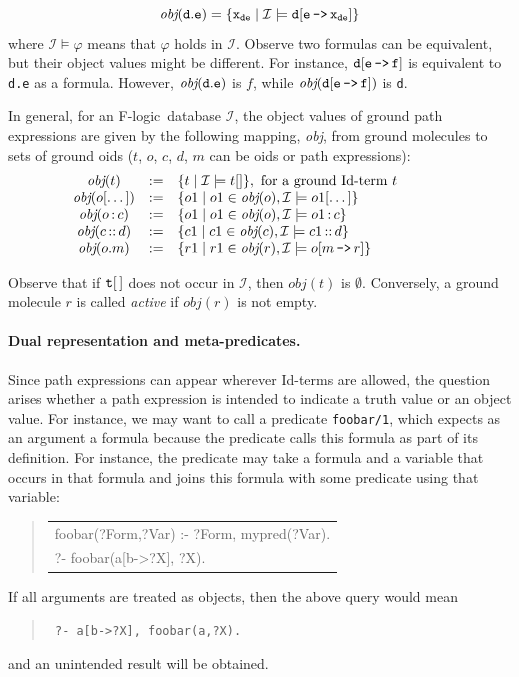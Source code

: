 \documentclass[11pt]{article}
\newenvironment{qrules}{\begin{quote}\tt\begin{tabular}[t]{l}}%
{\end{tabular}\end{quote}}
\newcommand{\obj}{\textit{obj}\xspace}
\newcommand{\db}[1]{\ensuremath{\mathcal{#1}}}
\newcommand{\isa}{\,{\bf{:}}\,}
\newcommand{\subcl}{\,{\bf{::}}\,}
\newcommand{\mvd}{{\mbox{\tt \,->\,}}}  %
\newcommand{\fl}{\mbox{F-logic}\xspace}
\begin{document}
\begin{displaymath} \tt
\obj(d.e) = \{x_{de} \mid \db I \models d[e\mvd 
x_{de}]\} 
\end{displaymath}
%
where $\db I \models \varphi$ means that $\varphi$ holds in \db I.  Observe
two formulas can be equivalent, but their object values might be different.
For instance, $\tt d[e\mvd f]$ is equivalent to {\tt d.e} as a formula.
However, $\tt \obj(d.e)$ is $f$, while $\tt \obj(d[e\mvd f])$ is {\tt d}.

In general, for an \fl\ database \db I, the object values of ground path
expressions are given by the following mapping, \obj, from ground molecules
to sets of ground oids ($t$, $o$, $c$, $d$, $m$ can be oids or path
expressions):
%
\begin{displaymath}
  \begin{array}{cll@{\hspace{4em}}c}
    \obj(t) & := & \{t \mid  \db I\models t[] \}, 
     \textrm{ for a ground Id-term $t$}  \\   
    \obj(o[\dots]) & := & \{o1 \mid o1\in\obj(o), \db I \models o1[\dots]
    \} \\  
    \obj(o\isa c) & := & \{o1 \mid o1\in\obj(o), \db I \models o1\isa c\}
     \\ 
    \obj(c\subcl d) & := & \{c1 \mid c1\in\obj(c), \db I \models c1\subcl
    d\} \\ 
    \obj(o.m) & :=  & \{r1 \mid r1\in\obj(r), \db I \models o[m\mvd
    r]\}  
  \end{array}
\end{displaymath}

Observe that if $\tt t[\,]$ does not occur in \db{I}, then $\obj(t)$ is
$\emptyset$.  Conversely, a ground molecule $r$ is called \emph{active} if
$\obj(r)$ is not empty.

\paragraph{Dual representation and meta-predicates.}
Since path expressions can appear wherever Id-terms are allowed, the
question arises whether a path expression is intended to indicate a truth
value or an object value. For instance, we may want to call a
predicate {\tt foobar/1}, which expects as an argument
a formula because the predicate calls this formula as part of its definition.
For instance, the predicate may take a formula and a variable that occurs
in that formula and joins this formula with some predicate using that
variable:
\begin{qrules}
  foobar(?Form,?Var) :- ?Form, mypred(?Var).\\
  ?- foobar(a[b->?X], ?X).
\end{qrules}
If all arguments are treated as objects, then the above query would mean
\begin{quote}
 \tt
 ?- a[b->?X], foobar(a,?X).
\end{quote}
and an unintended result will be obtained.
\end{document}
